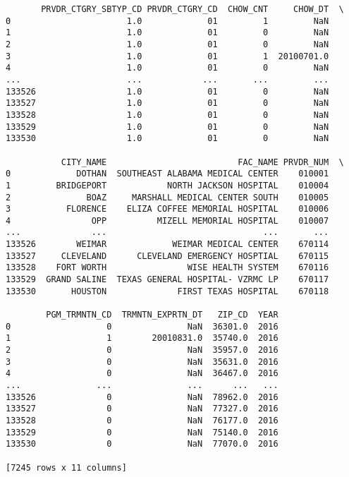 \documentclass[
  letterpaper,
  DIV=11,
  numbers=noendperiod]{scrartcl}
\begin{document}
\begin{verbatim}
       PRVDR_CTGRY_SBTYP_CD PRVDR_CTGRY_CD  CHOW_CNT     CHOW_DT  \
0                       1.0             01         1         NaN   
1                       1.0             01         0         NaN   
2                       1.0             01         0         NaN   
3                       1.0             01         1  20100701.0   
4                       1.0             01         0         NaN   
...                     ...            ...       ...         ...   
133526                  1.0             01         0         NaN   
133527                  1.0             01         0         NaN   
133528                  1.0             01         0         NaN   
133529                  1.0             01         0         NaN   
133530                  1.0             01         0         NaN   

           CITY_NAME                          FAC_NAME PRVDR_NUM  \
0             DOTHAN  SOUTHEAST ALABAMA MEDICAL CENTER    010001   
1         BRIDGEPORT            NORTH JACKSON HOSPITAL    010004   
2               BOAZ     MARSHALL MEDICAL CENTER SOUTH    010005   
3           FLORENCE    ELIZA COFFEE MEMORIAL HOSPITAL    010006   
4                OPP          MIZELL MEMORIAL HOSPITAL    010007   
...              ...                               ...       ...   
133526        WEIMAR             WEIMAR MEDICAL CENTER    670114   
133527     CLEVELAND      CLEVELAND EMERGENCY HOSPTIAL    670115   
133528    FORT WORTH                WISE HEALTH SYSTEM    670116   
133529  GRAND SALINE  TEXAS GENERAL HOSPITAL- VZRMC LP    670117   
133530       HOUSTON              FIRST TEXAS HOSPITAL    670118   

        PGM_TRMNTN_CD  TRMNTN_EXPRTN_DT   ZIP_CD  YEAR  
0                   0               NaN  36301.0  2016  
1                   1        20010831.0  35740.0  2016  
2                   0               NaN  35957.0  2016  
3                   0               NaN  35631.0  2016  
4                   0               NaN  36467.0  2016  
...               ...               ...      ...   ...  
133526              0               NaN  78962.0  2016  
133527              0               NaN  77327.0  2016  
133528              0               NaN  76177.0  2016  
133529              0               NaN  75140.0  2016  
133530              0               NaN  77070.0  2016  

[7245 rows x 11 columns]
\end{verbatim}
\end{document}
